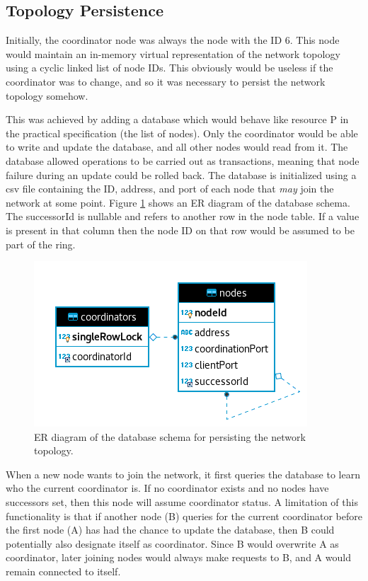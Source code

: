 \documentclass[12pt]{article}
\begin{document}
\subsection{Topology Persistence}

Initially, the coordinator node was always the node with the ID 6. This node would maintain an in-memory virtual representation of the network topology using a cyclic linked list of node IDs. This obviously would be useless if the coordinator was to change, and so it was necessary to persist the network topology somehow. 

This was achieved by adding a database which would behave like resource P in the practical specification (the list of nodes). Only the coordinator would be able to write and update the database, and all other nodes would read from it. The database allowed operations to be carried out as transactions, meaning that node failure during an update could be rolled back. The database is initialized using a csv file containing the ID, address, and port of each node that \emph{may} join the network at some point. Figure \ref{fig:er} shows an ER diagram of the database schema. The successorId is nullable and refers to another row in the node table. If a value is present in that column then the node ID on that row would be assumed to be part of the ring.

\begin{figure}[!ht]
	\centering
	\includegraphics[width=0.6\linewidth]{images/er}
	\caption{ER diagram of the database schema for persisting the network topology.}
	\label{fig:er}
\end{figure}

When a new node wants to join the network, it first queries the database to learn who the current coordinator is. If no coordinator exists and no nodes have successors set, then this node will assume coordinator status. A limitation of this functionality is that if another node (B) queries for the current coordinator before the first node (A) has had the chance to update the database, then B could potentially also designate itself as coordinator. Since B would overwrite A as coordinator, later joining nodes would always make requests to B, and A would remain connected to itself.
\end{document}
